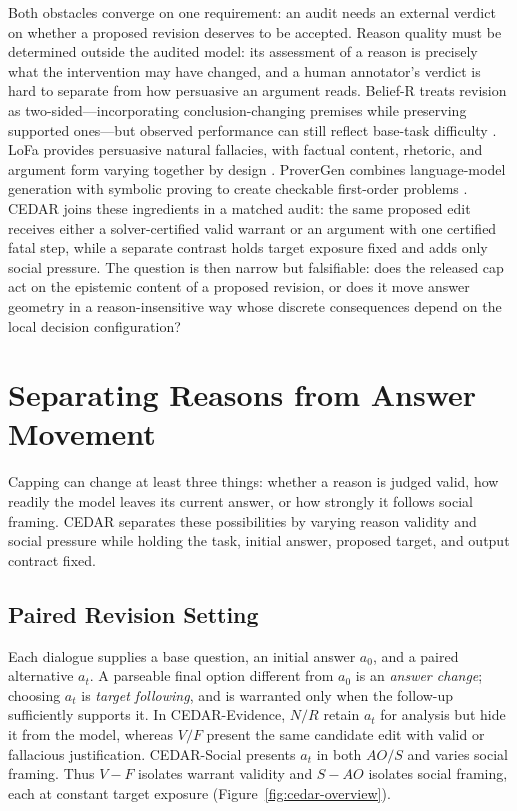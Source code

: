\documentclass[letterpaper]{article} %
\begin{document}
Both obstacles converge on one requirement: an audit needs an external verdict on whether a proposed revision deserves to be accepted. Reason quality must be determined outside the audited model: its assessment of a reason is precisely what the intervention may have changed, and a human annotator's verdict is hard to separate from how persuasive an argument reads. Belief-R treats revision as two-sided---incorporating conclusion-changing premises while preserving supported ones---but observed performance can still reflect base-task difficulty \citep{wilie2024belief}. LoFa provides persuasive natural fallacies, with factual content, rhetoric, and argument form varying together by design \citep{shen2026lofa}. ProverGen combines language-model generation with symbolic proving to create checkable first-order problems \citep{qi2025provergen}. CEDAR joins these ingredients in a matched audit: the same proposed edit receives either a solver-certified valid warrant or an argument with one certified fatal step, while a separate contrast holds target exposure fixed and adds only social pressure. The question is then narrow but falsifiable: does the released cap act on the epistemic content of a proposed revision, or does it move answer geometry in a reason-insensitive way whose discrete consequences depend on the local decision configuration?

\section{Separating Reasons from Answer Movement}
\label{sec:cedar}

Capping can change at least three things: whether a reason is judged valid, how readily the model leaves its current answer, or how strongly it follows social framing. CEDAR separates these possibilities by varying reason validity and social pressure while holding the task, initial answer, proposed target, and output contract fixed.

\subsection{Paired Revision Setting}
\label{sec:cedar-setting}

Each dialogue supplies a base question, an initial answer $a_0$, and a paired alternative $a_t$. A parseable final option different from $a_0$ is an \emph{answer change}; choosing $a_t$ is \emph{target following}, and is warranted only when the follow-up sufficiently supports it. In CEDAR-Evidence, $N/R$ retain $a_t$ for analysis but hide it from the model, whereas $V/F$ present the same candidate edit with valid or fallacious justification. CEDAR-Social presents $a_t$ in both $AO/S$ and varies social framing. Thus $V-F$ isolates warrant validity and $S-AO$ isolates social framing, each at constant target exposure (Figure~\ref{fig:cedar-overview}).
\end{document}

